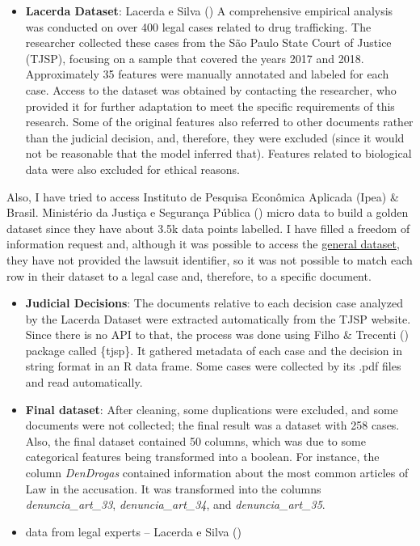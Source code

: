 \documentclass[
  12pt,
  letterpaper,
]{book}
\providecommand{\tightlist}{%
  \setlength{\itemsep}{0pt}\setlength{\parskip}{0pt}}\usepackage{longtable,booktabs,array}
\begin{document}
\begin{itemize}
\tightlist
\item
  \textbf{Lacerda Dataset}: Lacerda e Silva
  () A comprehensive
  empirical analysis was conducted on over 400 legal cases related to
  drug trafficking. The researcher collected these cases from the São
  Paulo State Court of Justice (TJSP), focusing on a sample that covered
  the years 2017 and 2018. Approximately 35 features were manually
  annotated and labeled for each case. Access to the dataset was
  obtained by contacting the researcher, who provided it for further
  adaptation to meet the specific requirements of this research. Some of
  the original features also referred to other documents rather than the
  judicial decision, and, therefore, they were excluded (since it would
  not be reasonable that the model inferred that). Features related to
  biological data were also excluded for ethical reasons.
\end{itemize}

Also, I have tried to access Instituto de Pesquisa Econômica Aplicada
(Ipea) \& Brasil. Ministério da Justiça e Segurança Pública
()
micro data to build a golden dataset since they have about 3.5k data
points labelled. I have filled a freedom of information request and,
although it was possible to access the
\href{https://www.gov.br/mj/pt-br/assuntos/sua-protecao/politicas-sobre-drogas/pesquisa-e-informacao-3/pesquisa\%20IPEA/pesquisa-ipea-perfil-processado-e-producao-de-provas}{general
dataset}, they have not provided the lawsuit identifier, so it was not
possible to match each row in their dataset to a legal case and,
therefore, to a specific document.

\begin{itemize}
\item
  \textbf{Judicial Decisions}: The documents relative to each decision
  case analyzed by the Lacerda Dataset were extracted automatically from
  the TJSP website. Since there is no API to that, the process was done
  using Filho \& Trecenti ()
  package called \{tjsp\}. It gathered metadata of each case and the
  decision in string format in an R data frame. Some cases were
  collected by its .pdf files and read automatically.
\item
  \textbf{Final dataset}: After cleaning, some duplications were
  excluded, and some documents were not collected; the final result was
  a dataset with 258 cases. Also, the final dataset contained 50
  columns, which was due to some categorical features being transformed
  into a boolean. For instance, the column \emph{DenDrogas} contained
  information about the most common articles of Law in the accusation.
  It was transformed into the columns \emph{denuncia\_art\_33},
  \emph{denuncia\_art\_34}, and \emph{denuncia\_art\_35}.
\item
  data from legal experts -- Lacerda e Silva
  ()
\end{itemize}
\end{document}
